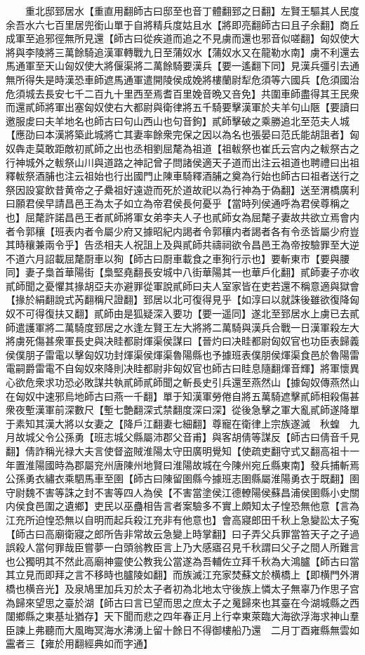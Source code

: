 　　重北邸郅居水【重直用翻師古曰邸至也音丁體翻郅之日翻】左賢王驅其人民度余吾水六七百里居兜銜山單于自將精兵度姑且水【將即亮翻師古曰且子余翻】商丘成軍至追邪徑無所見還【師古曰從疾道而追之不見虜而還也邪音似嗟翻】匈奴使大將與李陵將三萬餘騎追漢軍轉戰九日至蒲奴水【蒲奴水又在龍勒水南】虜不利還去馬通軍至天山匈奴使大將偃渠將二萬餘騎要漢兵【要一遙翻下同】見漢兵彊引去通無所得失是時漢恐車師遮馬通軍遣開陵侯成娩將樓蘭尉犁危須等六國兵【危須國治危須城去長安七千二百九十里西至焉耆百里娩音晩又咅免】共圍車師盡得其王民衆而還貳師將軍出塞匈奴使右大都尉與衛律將五千騎要擊漢軍於夫羊句山陿【要讀曰邀服䖍曰夫羊地名也師古曰句山西山也句音鉤】貳師擊破之乘勝追北至范夫人城【應劭曰本漢將築此城將亡其妻率餘衆完保之因以為名也張晏曰范氏能胡詛者】匈奴犇走莫敢距敵初貳師之出也丞相劉屈氂為祖道【祖軷祭也崔氏云宫内之軷祭古之行神城外之軷祭山川與道路之神記曾子問諸侯適天子道而出注云祖道也聘禮曰出祖釋軷祭酒脯也注云祖始也行出國門止陳車騎釋酒脯之奠為行始也師古曰祖者送行之祭因設宴飲昔黄帝之子纍祖好遠遊而死於道故祀以為行神為于偽翻】送至渭橋廣利曰願君侯早請昌邑王為太子如立為帝君侯長何憂乎【當時列侯通呼為君侯尊稱之也】屈氂許諾昌邑王者貳師將軍女弟李夫人子也貳師女為屈氂子妻故共欲立焉會内者令郭穰【班表内者令屬少府又據昭紀内謁者令郭穰内者謁者各有令丞皆屬少府豈其時穰兼兩令乎】告丞相夫人祝詛上及與貳師共禱祠欲令昌邑王為帝按驗罪至大逆不道六月詔載屈氂㕑車以狥【師古曰㕑車載食之車狥行示也】要斬東市【要與腰同】妻子梟首華陽街【梟堅堯翻長安城中八街華陽其一也華戶化翻】貳師妻子亦收貳師聞之憂懼其掾胡亞夫亦避罪從軍說貳師曰夫人室家皆在吏若還不稱意適與獄會【掾於絹翻說式芮翻稱尺證翻】郅居以北可復得見乎【如淳曰以就誅後雖欲復降匈奴不可得復扶又翻】貳師由是狐疑深入要功【要一遥同】遂北至郅居水上虜已去貳師遣護軍將二萬騎度郅居之水逢左賢王左大將將二萬騎與漢兵合戰一日漢軍殺左大將虜死傷甚衆軍長史與决眭都尉煇渠侯謀曰【晉灼曰决眭都尉匈奴官也功臣表歸義侯僕朋子雷電以擊匈奴功封煇渠侯煇渠魯陽縣也予據班表僕朋侯煇渠食邑於魯陽雷電嗣爵雷電不自匈奴來降則决眭都尉非匈奴官也師古曰眭息隨翻煇音輝】將軍懷異心欲危衆求功恐必敗謀共執貳師貳師聞之斬長史引兵還至燕然山【據匈奴傳燕然山在匈奴中速邪烏地師古曰燕一千翻】單于知漢軍勞倦自將五萬騎遮擊貳師相殺傷甚衆夜塹漢軍前深數尺【塹七艶翻深式禁翻度深曰深】從後急擊之軍大亂貳師遂降單于素知其漢大將以女妻之【降戶江翻妻七細翻】尊寵在衛律上宗族遂滅　秋蝗　九月故城父令公孫勇【班志城父縣屬沛郡父音甫】與客胡倩等謀反【師古曰倩音千見翻】倩詐稱光禄大夫言使督盗賊淮陽太守田廣明覺知【使疏吏翻守式又翻高祖十一年置淮陽國時為郡屬兖州唐陳州地賢曰淮陽故城在今陳州宛丘縣東南】發兵捕斬焉公孫勇衣繡衣乘駟馬車至圉【師古曰陳留圉縣今據班志圉縣屬淮陽勇衣于既翻】圉守尉魏不害等誅之封不害等四人為侯【不害當塗侯江德轑陽侯蘇昌浦侯圉縣小史關内侯食邑圍之遺鄉】吏民以巫蠱相告言者案驗多不實上頗知太子惶恐無他意【言為江充所迫惶恐無以自明而起兵殺江充非有他意也】會高寢郎田千秋上急變訟太子寃【師古曰高廟衛寢之郎所告非常故云急變上時掌翻】曰子弄父兵罪當笞天子之子過誤殺人當何罪哉臣嘗夢一白頭翁教臣言上乃大感寤召見千秋謂曰父子之間人所難言也公獨明其不然此高廟神靈使公教我公當遂為吾輔佐立拜千秋為大鴻臚【師古曰當其立見而即拜之言不移時也臚陵如翻】而族滅江充家焚蘇文於横橋上【即横門外渭橋也横咅光】及泉鳩里加兵刃於太子者初為北地太守後族上憐太子無辜乃作思子宫為歸來望思之臺於湖【師古曰言已望而思之庶太子之䰟歸來也其臺在今湖城縣之西闥鄉縣之東基址猶存】天下聞而悲之四年春正月上行幸東萊臨大海欲浮海求神山羣臣諫上弗聽而大風晦冥海水沸湧上留十餘日不得御樓船乃還　二月丁酉雍縣無雲如靁者三【雍於用翻經典如而字通】